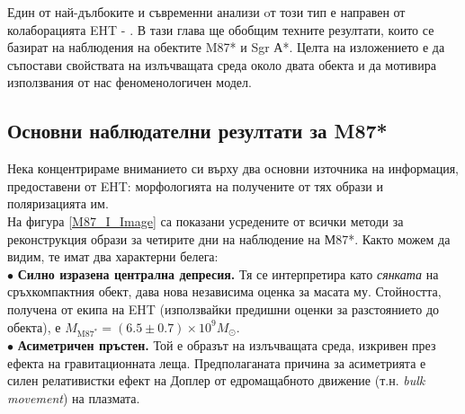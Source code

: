 Един от най-дълбоките и съвременни анализи oт този тип е направен от колаборацията EHT \cite{EHT_M87_I} - \cite{EHT_SGR_VIII}. В тази глава ще обобщим техните резултати, които се базират на наблюдения на обектите M87* и Sgr А*. Целта на изложението е да съпостави свойствата на излъчващата среда около двата обекта и да мотивира използвания от нас феноменологичен модел.
\newpage
\subsection{Основни наблюдателни резултати за M87*}

Нека концентрираме вниманието си върху два основни източника на информация, предоставени от EHT: морфологията на получените от тях образи и поляризацията им. \\

На фигура \ref*{M87_I_Image} са показани усредените от всички методи за реконструкция образи за четирите дни на наблюдение на М87*. Както можем да видим, те имат два характерни белега:\\

$\bullet$ \textbf{Силно изразена централна депресия.} Тя се интерпретира като \emph{сянката} на сръхкомпактния обект, дава нова независима оценка за масата му. Стойността, получена от екипа на EHT (използвайки предишни оценки за разстоянието до обекта), е $M_{\text{M87}^*} = (6.5\pm 0.7)\times 10^{9} M_\odot$.\\

$\bullet$ \textbf{Асиметричен пръстен.} Той е образът на излъчващата среда, изкривен през ефекта на гравитационната леща. Предполаганата причина за асиметрията е силен релативистки ефект на Доплер от едромащабното движение (т.н. \emph{bulk movement}) на плазмата.\\

